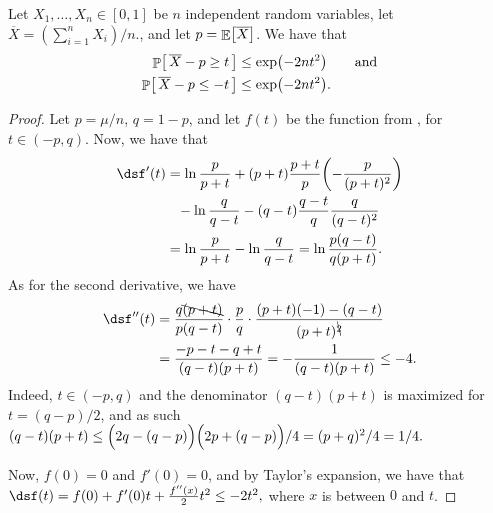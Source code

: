 \begin{theorem}
    Let $X_1, \ldots, X_n \in [0,1]$ be $n$ independent random variables, let
    $\overline{X} = (\sum_{i=1}^n X_i)/n\bigl.$, and let
    $p = \mathop{\mathbb{E}}\!\left[ {\overline{X}} \right]$.  We have that
    \begin{align*}
        \Prob{\bigl.\,\overline{X} - p \geq t\, }
        &\leq
        \exp\pth{ -2 n t^2}
        \qquad\text{and} \\
        \Prob{\bigl.\, \overline{X} - p \leq -t \, }
        &\leq
        \exp\pth{ -2 n t^2}.
    \end{align*}
\end{theorem}
\begin{proof}
    Let $p = \mu/n$, $q =1-p$, and let $f(t)$ be the function from
    , for $t \in (-p,q)$. Now, we have that
    \begin{align*}
        \ds%
        f'(t)%
        &=%
        \ln \frac{p}{p+t}%
        + (p+t) \frac{p+t}{p} \pth{-\frac{p}{(p+t)^2}}%
        \\&\phantom{=}%
        - \ln \frac{q}{q-t}%
        - (q-t)\frac{q-t}{q}\frac{q}{(q-t)^2}%
        \\&=%
        \ln \frac{p}{p+t} - \ln \frac{q}{q-t}%
        =%
        \ln \frac{p(q-t)}{q(p+t)}. %
    \end{align*}
    As for the second derivative, we have
    \begin{align*}
        \ds%
        f''(t)%
        &=%
        \frac{q\bcancel{(p+t)}}{p(q-t)} %
        \cdot \frac{p}{q} \cdot%
        \frac{(p+t)(-1) - (q-t) } {(p+t)^{\bcancel{2}}} %
        \\&=%
        \frac{-p-t - q+t } {(q-t)(p+t)} %
        =%
        - \frac{1 } {(q-t)(p+t)} %
        \leq%
        -4.
    \end{align*}
    Indeed, $t\in (-p,q)$ and the denominator $(q-t)(p+t)$ is maximized for
    $t = (q-p)/2$, and as such
    \begin{math}
        (q-t)(p+t)%
        \leq%
        \pth{\Bigl.2q -(q- p)} \pth{\Bigl. 2p +(q -p)}/4 =%
        (p+q)^2/4 = 1/4.
    \end{math}

    Now, $f(0) =0$ and $f'(0) = 0$, and by Taylor's expansion, we have
    that
    \begin{math}
        \ds%
        f(t) = f(0) + f'(0)t + \frac{f''(x)}{2} t^2 \leq -2 t^2,
    \end{math}
    where $x$ is between $0$ and $t$.


\end{proof}
